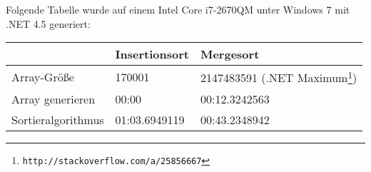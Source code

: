 Folgende Tabelle wurde auf einem Intel Core i7-2670QM unter Windows 7 mit .NET 4.5 generiert: \\[0.25cm]

\begin{tabularx}{\textwidth}{|l|X|X|}
	\hline
	& \textbf{Insertionsort} & \textbf{Mergesort} \\
    \hline
    Array-Größe & 170001 & 2147483591 (.NET Maximum\footnote{\texttt{http://stackoverflow.com/a/25856667}}) \\
    \hline
    Array generieren & 00:00 & 00:12.3242563 \\
    \hline
    Sortieralgorithmus & 01:03.6949119 & 00:43.2348942 \\
    \hline
\end{tabularx}